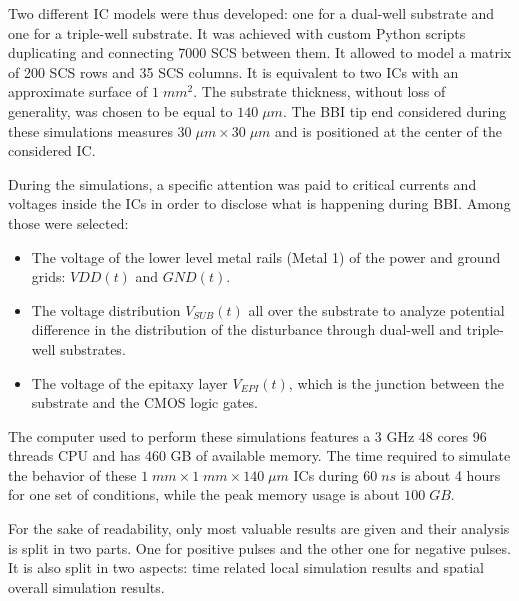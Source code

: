 \documentclass[10pt, conference, compsocconf]{IEEEtran}
\begin{document}
Two different IC models were thus developed: one for a dual-well substrate and one for a triple-well substrate. It was achieved with custom Python scripts duplicating and connecting 7000 SCS between them. It allowed to model a matrix of 200 SCS rows and 35 SCS columns. It is equivalent to two ICs with an approximate surface of $1 \; mm ^2$. The substrate thickness, without loss of generality, was chosen to be equal to $140 \; \mu m$. The BBI tip end considered during these simulations measures $30 \; \mu m \times 30 \; \mu m$ and is positioned at the center of the considered IC.

During the simulations, a specific attention was paid to critical currents and voltages inside the ICs in order to disclose what is happening during BBI. Among those were selected:
\begin{itemize}
\item The voltage of the lower level metal rails (Metal 1) of the power and ground grids: $VDD(t)$ and $GND(t)$.
\item The voltage distribution $V_{SUB}(t)$ all over the substrate to analyze potential difference in the distribution of the disturbance through dual-well and triple-well substrates.
\item The voltage of the epitaxy layer $V_{EPI}(t)$, which is the junction between the substrate and the CMOS logic gates.
\end{itemize} 

The computer used to perform these simulations features a 3 GHz 48 cores 96 threads CPU and has 460 GB of available memory. The time required to simulate the behavior of these $1 \; mm \times 1 \; mm \times 140 \; \mu m$ ICs during $60 \; ns$ is about 4 hours for one set of conditions, while the peak memory usage is about $100 \; GB$.

For the sake of readability, only most valuable results are given and their analysis is split in two parts. One for positive pulses and the other one for negative pulses. It is also split in two aspects: time related local simulation results and spatial overall simulation results.
\end{document}
